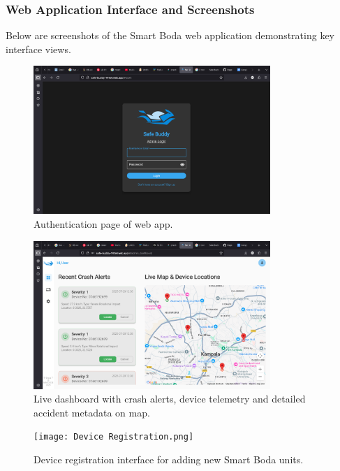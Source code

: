 \documentclass[12pt]{article}
\begin{document}
\subsubsection{Web Application Interface and Screenshots}

Below are screenshots of the Smart Boda web application demonstrating key interface views.

\begin{figure}[H]
  \centering
  \includegraphics[width=0.8\textwidth]{Login.png}
  \caption{Authentication page of web app.}
  \label{fig:login}
\end{figure}

\begin{figure}[H]
  \centering
  \includegraphics[width=0.8\textwidth]{Dashboard.png}
  \caption{Live dashboard with crash alerts, device telemetry and detailed accident metadata on map.}
  \label{fig:dashboard}
\end{figure}

\begin{figure}[H]
  \centering
  \texttt{[image: Device Registration.png]}
  \caption{Device registration interface for adding new Smart Boda units.}
  \label{fig:registration}
\end{figure}
\end{document}
